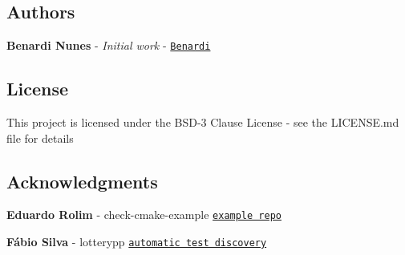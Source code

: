 \subsection*{Authors}


\begin{DoxyItemize}
\item {\bfseries Benardi Nunes} -\/ {\itshape Initial work} -\/ \href{https://github.com/Benardi}{\tt Benardi}
\end{DoxyItemize}

\subsection*{License}

This project is licensed under the B\+S\+D-\/3 Clause License -\/ see the L\+I\+C\+E\+N\+SE.md file for details

\subsection*{Acknowledgments}


\begin{DoxyItemize}
\item {\bfseries Eduardo Rolim} -\/ check-\/cmake-\/example \href{https://github.com/vndmtrx/check-cmake-example}{\tt example repo}
\item {\bfseries Fábio Silva} -\/ lotterypp \href{https://github.com/ffosilva/lotopp}{\tt automatic test discovery} 
\end{DoxyItemize}